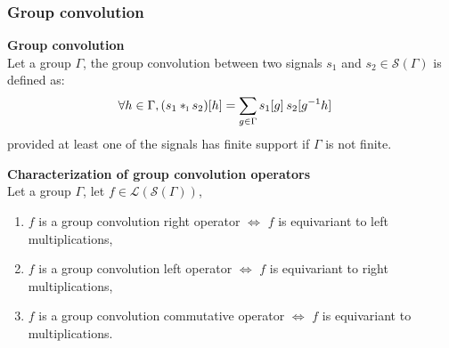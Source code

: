 \documentclass[t,9pt,pdftex]{beamer}
\theoremstyle{definition}
\newcommand{\cl}{\mathcal{L}}
\newcommand{\cs}{\mathcal{S}}
\DeclareMathOperator{\I}{\textsc{i}}
\newcommand{\st}{\emph{s.t.}~}
\newcommand{\h}[1]{\hspace{#1pt}}
\begin{document}
\begin{frame}[c, label=current]
  \frametitle{Group convolution}
    \begin{definition}\textbf{Group convolution}\\
    Let a group $\Gamma$, the group convolution between two signals $s_1$ and $s_2 \in \cs(\Gamma)$ is defined as:
    \begin{align*}
    \forall h \in \Gamma, (s_1 \ast_{\I} s_2)[h] & = \displaystyle \sum_{g \in \Gamma} s_1[g] \h{2} s_2[g^{-1}h]%
    \end{align*}
    provided at least one of the signals has finite support if $\Gamma$ is not finite.
    \label{def:conv1}
    \end{definition}

    \begin{theorem}\textbf{Characterization of group convolution operators}\\
    Let a group $\Gamma$, let $f \in \cl(\cs(\Gamma))$,
    \begin{enumerate}%
      \item $f$ is a group convolution right operator $\Leftrightarrow$ $f$ is equivariant to left multiplications, %
      \item $f$ is a group convolution left operator $\Leftrightarrow$ $f$ is equivariant to right multiplications, %
      \item $f$ is a group convolution commutative operator $\Leftrightarrow$ $f$ is equivariant to multiplications. %
    \end{enumerate}
    \end{theorem}
\end{frame}

  


\end{document}
